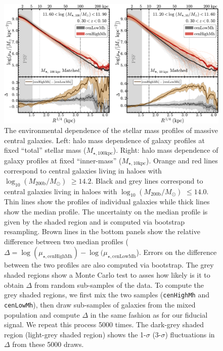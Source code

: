\documentclass[a4paper,fleqn,usenatbib]{mnras}
\def\rbcg{\texttt{cenHighMh}}
\def\nbcg{\texttt{cenLowMh}}
\def\logmh{{$\log_{10} (M_{\mathrm{200b}}/M_{\odot})$}}
\def\minn{{$M_{\star,10\mathrm{kpc}}$}}
\def\mtot{{$M_{\star,100\mathrm{kpc}}$}}
\begin{document}
  \begin{figure}
      \centering 
      \includegraphics[width=\textwidth]{fig/redbcg_prof_1}
      \caption{
          The environmental dependence of the stellar mass profiles of massive central 
          galaxies. 
          Left: halo mass dependence of galaxy profiles at fixed ``total'' stellar mass 
          (\mtot{}). 
          Right: halo mass dependence of galaxy profiles at fixed ``inner-mass'' 
          (\minn{}). Orange and red lines correspond to central galaxies living in 
          haloes with \logmh{} $\geq 14.2$. 
          Black and grey lines correspond to central galaxies living in haloes with 
          \logmh{} $\leq 14.0$. 
          Thin lines show the profiles of individual galaxies while thick lines show 
          the median profile. 
          The uncertainty on the median profile is given by the shaded region and is 
          computed via bootstrap resampling. 
          Brown lines in the bottom panels show the relative difference between  
          two median profiles 
          ($\Delta = \log(\mu_{\star, \mathrm{cenHighMh}}) - 
          \log(\mu_{\star, \mathrm{cenLowMh}}$). 
          Errors on the difference between the two profiles are also computed 
          via bootstrap.
          The grey shaded regions show a Monte Carlo test to asses how likely is it to 
          obtain $\Delta$ from random sub-samples of the data. 
          To compute the grey shaded regions, we first mix the two samples 
          (\rbcg{} and \nbcg{}), then draw sub-samples of galaxies from the mixed 
          population and compute $\Delta$ in the same fashion as for our fiducial 
          signal. 
          We repeat this process 5000 times.  
          The dark-grey shaded region (light-grey shaded region) shows the 1-$\sigma$ 
          (3-$\sigma$) fluctuations in $\Delta$ from these 5000 draws.
          }
      \label{fig:prof_1} 
  \end{figure}
\end{document}
